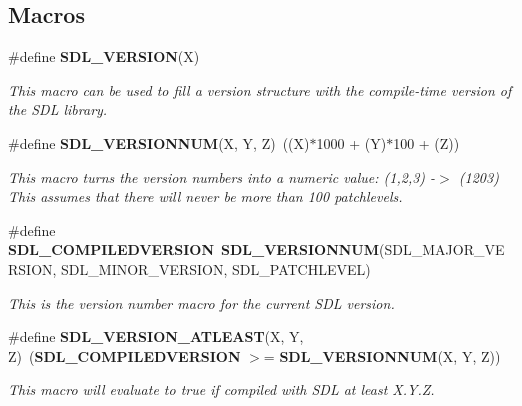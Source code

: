 \subsection*{Macros}
\begin{DoxyCompactItemize}
\item 
\#define {\bf S\+D\+L\+\_\+\+V\+E\+R\+S\+I\+O\+N}(X)
\begin{DoxyCompactList}\small\item\em This macro can be used to fill a version structure with the compile-\/time version of the S\+D\+L library. \end{DoxyCompactList}\item 
\#define {\bf S\+D\+L\+\_\+\+V\+E\+R\+S\+I\+O\+N\+N\+U\+M}(X,  Y,  Z)~((X)$\ast$1000 + (Y)$\ast$100 + (Z))\label{_s_d_l__version_8h_af77ec4d486c3401e48689a016d304e73}

\begin{DoxyCompactList}\small\item\em This macro turns the version numbers into a numeric value\+: (1,2,3) -\/$>$ (1203) This assumes that there will never be more than 100 patchlevels. \end{DoxyCompactList}\item 
\#define {\bf S\+D\+L\+\_\+\+C\+O\+M\+P\+I\+L\+E\+D\+V\+E\+R\+S\+I\+O\+N}~{\bf S\+D\+L\+\_\+\+V\+E\+R\+S\+I\+O\+N\+N\+U\+M}(S\+D\+L\+\_\+\+M\+A\+J\+O\+R\+\_\+\+V\+E\+R\+S\+I\+O\+N, S\+D\+L\+\_\+\+M\+I\+N\+O\+R\+\_\+\+V\+E\+R\+S\+I\+O\+N, S\+D\+L\+\_\+\+P\+A\+T\+C\+H\+L\+E\+V\+E\+L)\label{_s_d_l__version_8h_a75227c9b9ca2b4015e4697971712f16c}

\begin{DoxyCompactList}\small\item\em This is the version number macro for the current S\+D\+L version. \end{DoxyCompactList}\item 
\#define {\bf S\+D\+L\+\_\+\+V\+E\+R\+S\+I\+O\+N\+\_\+\+A\+T\+L\+E\+A\+S\+T}(X,  Y,  Z)~({\bf S\+D\+L\+\_\+\+C\+O\+M\+P\+I\+L\+E\+D\+V\+E\+R\+S\+I\+O\+N} $>$= {\bf S\+D\+L\+\_\+\+V\+E\+R\+S\+I\+O\+N\+N\+U\+M}(X, Y, Z))\label{_s_d_l__version_8h_a44836f955b961ba74c8c5125af4c9b91}

\begin{DoxyCompactList}\small\item\em This macro will evaluate to true if compiled with S\+D\+L at least X.\+Y.\+Z. \end{DoxyCompactList}\end{DoxyCompactItemize}
